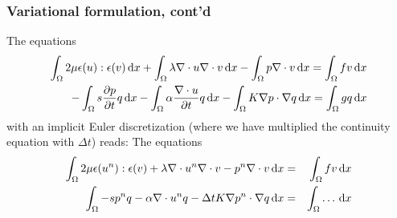 \begin{frame}
\frametitle{Variational formulation, cont'd}
The equations 
\begin{eqnarray*} 
\int_\Omega 2 \mu \epsilon(u) : \epsilon(v) \, \mathrm{d}x + 
\int_\Omega \lambda  \nabla \cdot u \nabla \cdot v \, \mathrm{d}x -
\int_\Omega p \nabla \cdot v \, \mathrm{d}x = 
\int_\Omega f v \, \mathrm{d}x \\  
-\int_\Omega s \frac{\partial p}{\partial t} q \, \mathrm{d}x - 
\int_\Omega \alpha \frac{\nabla \cdot u}{\partial t} q \, \mathrm{d}x - 
\int_\Omega K \nabla p \cdot \nabla q \, \mathrm{d}x = 
\int_\Omega g q \, \mathrm{d}x 
\end{eqnarray*}
with an implicit Euler discretization (where we have multiplied the continuity equation 
with $\Delta t$) reads: 
The equations 
\begin{eqnarray*} 
\int_\Omega 2 \mu \epsilon(u^n) : \epsilon(v)  + 
\lambda  \nabla \cdot u^n \nabla \cdot v  -
p^n \nabla \cdot v \, \mathrm{d}x  &=& 
\int_\Omega f v  \, \mathrm{d}x \\  
\int_\Omega -s p^n q  - 
 \alpha \nabla \cdot u^n q  - 
 \Delta t K \nabla p^n \cdot \nabla q \, \mathrm{d}x &=& 
\int_\Omega \ldots \, \mathrm{d}x  
\end{eqnarray*}
\end{frame}
